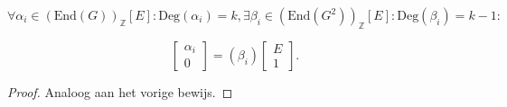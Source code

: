\documentclass[a4paper,12pt]{article}
\begin{document}


\begin{conjecture}
    $\forall \alpha_i \in (\text{End}(G))_\mathbb{Z}[E]: \text{Deg}(\alpha_i) = k, \exists \beta_i \in (\text{End}(G^2))_\mathbb{Z}[E]:
        \text{Deg}(\beta_i) = k-1:$

    $$
        \left[ {
                    \begin{array}{c}
                        \alpha_i \\
                        0
                    \end{array} } \right]
        =
        \left(
        \beta_i \right)
        \left[ {
                    \begin{array}{c}
                        E \\
                        1
                    \end{array} } \right].
    $$
\end{conjecture}

\begin{proof}
    Analoog aan het vorige bewijs.
\end{proof}
\end{document}
